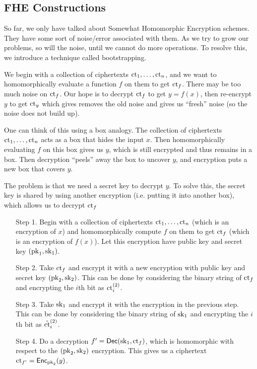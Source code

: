 \subsection{FHE Constructions}

So far, we only have talked about Somewhat Homomorphic Encryption schemes. They have some sort of noise/error associated with them. As we try to grow our problems, so will the noise, until we cannot do more operations. To resolve this, we introduce a technique called bootstrapping.

We begin with a collection of ciphertexts $\mathrm{ct}_1, \dots, \mathrm{ct}_n$, and we want to homomorphically evaluate a function $f$ on them to get $\mathrm{ct}_f$. There may be too much noise on $\mathrm{ct}_f$. Our hope is to decrypt $\mathrm{ct}_f$ to get $y= f(x)$, then re-encrypt $y$ to get $\mathrm{ct}_y$ which gives removes the old noise and gives us ``fresh'' noise (so the noise does not build up).

\begin{center}
    \def\svgwidth{0.55\columnwidth}
    
\end{center}

One can think of this using a box analogy. The collection of ciphertexts $\mathrm{ct}_1, \dots, \mathrm{ct}_n$ acts as a box that hides the input $x$. Then homomorphically evaluating $f$ on this box gives us $y$, which is still encrypted and thus remains in a box. Then decryption ``peels'' away the box to uncover $y$, and encryption puts a new box that covers $y$.

The problem is that we need a secret key to decrypt $y$. To solve this, the secret key is shared by using another encryption (i.e. putting it into another box), which allows us to decrypt $\mathrm{ct}_f$

\begin{enumerate}
    \item[Step 1.] Begin with a collection of ciphertexts $\mathrm{ct}_1, \dots, \mathrm{ct}_n$ (which is an encryption of $x$) and homomorphically compute $f$ on them to get $\mathrm{ct}_f$ (which is an encryption of $f(x)$). Let this encryption have public key and secret key $(\mathrm{pk}_1, \mathrm{sk}_1)$.
    \item[Step 2.] Take $\mathrm{ct}_f$ and encrypt it with a new encryption with public key and secret key $(\mathrm{pk}_2, \mathrm{sk}_2)$. This can be done by considering the binary string of $\mathrm{ct}_f$ and encrypting the $i$th bit as $\mathrm{ct}_i^{(2)}$.
    \item[Step 3.] Take $\mathrm{sk}_1$ and encrypt it with the encryption in the previous step. This can be done by considering the binary string of $\mathrm{sk}_1$ and encrypting the $i$th bit as $\tilde{\mathrm{ct}}_i^{(2)}$.
    \item[Step 4.] Do a decryption $f' = \operatorname{\mathsf{Dec}}(\mathrm{sk}_1, \mathrm{ct}_f)$, which is homomorphic with respect to the $(\mathrm{pk}_2, \mathrm{sk}_2)$ encryption. This gives us a ciphertext $\mathrm{ct}_{f'} = \operatorname{\mathsf{Enc}}_{\mathrm{pk}_2}(y)$.
\end{enumerate}

